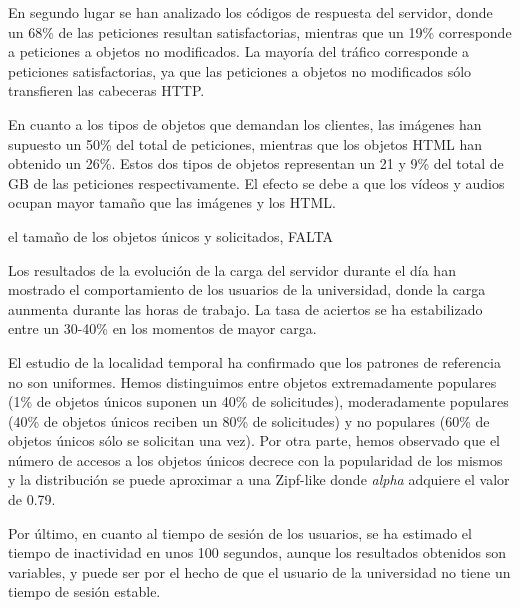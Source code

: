 \documentclass[twocolumn]{Jornadas}
\begin{document}
En segundo lugar se han analizado los códigos de respuesta del servidor, donde un 68\% de las peticiones resultan satisfactorias, mientras que un 19\% corresponde a peticiones a objetos no modificados. La mayoría del tráfico corresponde a peticiones satisfactorias, ya que las peticiones a objetos no modificados sólo transfieren las cabeceras HTTP.

En cuanto a los tipos de objetos que demandan los clientes, las imágenes han supuesto un 50\% del total de peticiones, mientras que los objetos HTML han obtenido un 26\%. Estos dos tipos de objetos representan un 21 y 9\% del total de GB de las peticiones respectivamente. El efecto se debe a que los vídeos y audios ocupan mayor tamaño que las imágenes y los HTML.

el tamaño de los objetos únicos y solicitados, FALTA

Los resultados de la evolución de la carga del servidor durante el día han mostrado el comportamiento de los usuarios de la universidad, donde la carga aunmenta durante las horas de trabajo. La tasa de aciertos se ha estabilizado entre un 30-40\% en los momentos de mayor carga.

El estudio de la localidad temporal ha confirmado que los patrones de referencia no son uniformes. Hemos distinguimos entre objetos extremadamente populares (1\% de objetos únicos suponen un 40\% de solicitudes), moderadamente populares (40\% de objetos únicos reciben un 80\% de solicitudes) y no populares (60\% de objetos únicos sólo se solicitan una vez). Por otra parte, hemos observado que el número de accesos a los objetos únicos decrece con la popularidad de los mismos y la distribución se puede aproximar a una Zipf-like donde \emph{alpha} adquiere el valor de 0.79.

Por último, en cuanto al tiempo de sesión de los usuarios, se ha estimado el tiempo de inactividad en unos 100 segundos, aunque los resultados obtenidos son variables, y puede ser por el hecho de que el usuario de la universidad no tiene un tiempo de sesión estable.

\nocite{*}

\end{document}
